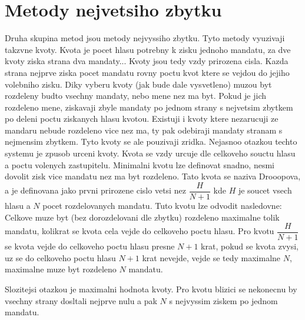 \documentclass[12pt,a4paper]{article}
\begin{document}
\section{Metody nejvetsiho zbytku}
Druha skupina metod jsou metody nejvyssiho zbytku. Tyto metody vyuzivaji takzvne kvoty. Kvota je pocet hlasu potrebny k zisku jednoho mandatu, za dve kvoty ziska strana dva mandaty... Kvoty jsou tedy vzdy prirozena cisla. Kazda strana nejprve ziska pocet mandatu rovny poctu kvot ktere se vejdou do jejiho volebniho zisku. Diky vyberu kvoty (jak bude dale vysvetleno) muzou byt rozdeleny budto vsechny mandaty, nebo mene nez ma byt. Pokud je jich rozdeleno mene, ziskavaji zbyle mandaty po jednom strany s nejvetsim zbytkem po deleni poctu ziskanych hlasu kvotou. Existuji i kvoty ktere nezarucuji ze mandaru nebude rozdeleno vice nez ma, ty pak odebiraji mandaty stranam s nejmensim zbytkem. Tyto kvoty se ale pouzivaji zridka.
Nejasnoo otazkou techto systemu je zpusob urceni kvoty. Kvota se vzdy urcuje dle celkoveho souctu hlasu a poctu volenych zastupitelu. Minimalni kvotu lze definovat snadno, nesmi dovolit zisk vice mandatu nez ma byt rozdeleno. Tato kvota se naziva Drooopova, a je definovana jako prvni prirozene cislo vetsi nez $\dfrac{H}{N+1}$ kde $H$ je soucet vsech hlasu a $N$ pocet rozdelovanych mandatu. Tuto kvotu lze odvodit nasledovne: Celkove muze byt (bez dorozdelovani dle zbytku) rozdeleno maximalne tolik mandatu, kolikrat se kvota cela vejde do celkoveho poctu hlasu. Pro kvotu $\dfrac{H}{N+1}$ se kvota vejde do celkoveho poctu hlasu presne $N+1$ krat, pokud se kvota zvysi, uz se do celkoveho poctu hlasu $N+1$ krat nevejde, vejde se tedy maximalne $N$, maximalne muze byt rozdeleno $N$ mandatu.

Slozitejsi otazkou je maximalni hodnota kvoty. Pro kvotu blizici se nekonecnu by vsechny strany dosltali nejprve nulu a pak $N$ s nejvyssim ziskem po jednom mandatu.
\end{document}
